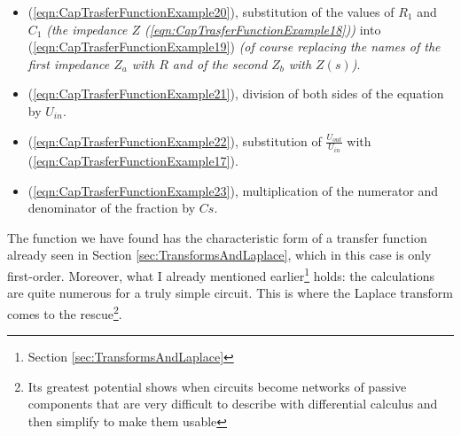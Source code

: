 \documentclass[a4paper, 10pt, final]{article} %
\begin{document}
    \begin{itemize}
        \item (\ref{eqn:CapTrasferFunctionExample20}), substitution of the values of $R_1$ and $C_1$ \emph{(the impedance $Z$ (\ref{eqn:CapTrasferFunctionExample18}))} into (\ref{eqn:CapTrasferFunctionExample19}) \emph{(of course replacing the names of the first impedance $Z_a$ with $R$ and of the second $Z_b$ with $Z(s)$)}.
        \item (\ref{eqn:CapTrasferFunctionExample21}), division of both sides of the equation by $U_{in}$.
        \item (\ref{eqn:CapTrasferFunctionExample22}), substitution of $\frac{U_{out}}{U_{in}}$ with (\ref{eqn:CapTrasferFunctionExample17}).
        \item (\ref{eqn:CapTrasferFunctionExample23}), multiplication of the numerator and denominator of the fraction by $C s$.
    \end{itemize}
    \noindent The function we have found has the characteristic form of a transfer function already seen in Section \ref{sec:TransformsAndLaplace}, which in this case is only first-order.
    Moreover, what I already mentioned earlier\footnote{Section \ref{sec:TransformsAndLaplace}} holds: the calculations are quite numerous for a truly simple circuit.
    This is where the Laplace transform comes to the rescue\footnote{Its greatest potential shows when circuits become networks of passive components that are very difficult to describe with differential calculus and then simplify to make them usable}.
\end{document}
